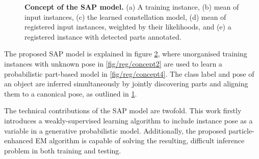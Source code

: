 \begin{figure}[ht]
\begin{subfigure}[b]{0.28\linewidth}
	\label{fig/reg/concept5}
\end{subfigure}
\caption{\textbf{Concept of the SAP model.} (a) A training instance, (b) mean of input instances, (c) the learned constellation model, (d) mean of registered input instances, weighted by their likelihoods, and (e) a registered instance with detected parts annotated.}
\label{fig/reg/concept}
\end{figure}

The proposed SAP model is explained in figure \ref{fig/reg/concept}, where unorganised training instances with unknown pose in \ref{fig/reg/concept2} are used to learn a probabilistic part-based model in \ref{fig/reg/concept4}. The class label and pose of an object are inferred simultaneously by jointly discovering parts and aligning them to a canonical pose, as outlined in \ref{fig/reg/concept5}. 

The technical contributions of the SAP model are twofold. 
This work firstly introduces a weakly-supervised learning algorithm to include instance pose as a variable in a generative probabilistic model. Additionally, the proposed particle-enhanced EM algorithm is capable of solving the resulting, difficult inference problem in both training and testing.  






